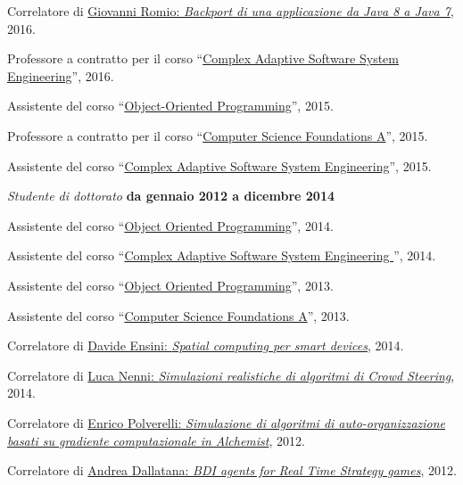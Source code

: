 \documentclass[10pt]{article}
\newenvironment{outerlist}[1][\enskip\textbullet]%
        {\begin{itemize}[#1]}{\end{itemize}%
         \vspace{-.6\baselineskip}}
\newenvironment{innerlist}[1][\enskip\textbullet]%
        {\begin{compactitem}[#1]}{\end{compactitem}}
\begin{document}
\begin{outerlist}
\begin{innerlist}
      \item Correlatore di \href{http://amslaurea.unibo.it/10481/}{Giovanni Romio: \textit{Backport di una applicazione da Java 8 a Java 7}}, 2016.
      \item Professore a contratto per il corso ``\href{http://apice.unibo.it/xwiki/bin/view/Courses/ISAC1516}{Complex Adaptive Software System Engineering}'', 2016.
      \item Assistente del corso ``\href{http://apice.unibo.it/xwiki/bin/view/Courses/OOP1516}{Object-Oriented Programming}'', 2015.
      \item Professore a contratto per il corso ``\href{http://www.apice.unibo.it/xwiki/bin/view/Courses/FINFA1415/}{Computer Science Foundations A}'', 2015.
      \item Assistente del corso ``\href{http://apice.unibo.it/xwiki/bin/view/Courses/ISAC1415}{Complex Adaptive Software System Engineering}'', 2015.
    \end{innerlist}
\item[] \textit{Studente di dottorato} \hfill \textbf{da gennaio 2012 a dicembre 2014}
    \begin{innerlist}
      \item Assistente del corso ``\href{http://apice.unibo.it/xwiki/bin/view/Courses/OOP1415}{Object Oriented Programming}'', 2014.
      \item Assistente del corso ``\href{http://apice.unibo.it/xwiki/bin/view/Courses/ISAC1314}{Complex Adaptive Software System Engineering }'', 2014.
      \item Assistente del corso ``\href{http://apice.unibo.it/xwiki/bin/view/Courses/OOP1314}{Object Oriented Programming}'', 2013.
      \item Assistente del corso ``\href{http://www.apice.unibo.it/xwiki/bin/view/Courses/FINFA1213/}{Computer Science Foundations A}'', 2013.
      \item Correlatore di \href{http://amslaurea.unibo.it/7990/}{Davide Ensini: \textit{Spatial computing per smart devices}}, 2014.
      \item Correlatore di \href{http://amslaurea.unibo.it/6927/}{Luca Nenni: \textit{Simulazioni realistiche di algoritmi di Crowd Steering}}, 2014.
      \item Correlatore di \href{http://amslaurea.unibo.it/5293/}{Enrico Polverelli: \textit{Simulazione di algoritmi di auto-organizzazione basati su gradiente computazionale in Alchemist}}, 2012.
      \item Correlatore di \href{http://amslaurea.unibo.it/4217/}{Andrea Dallatana: \textit{BDI agents for Real Time Strategy games}}, 2012.

\end{innerlist}
\end{outerlist}
\end{document}
